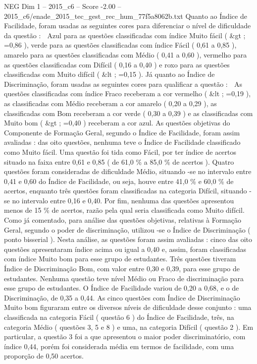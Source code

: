 \begin{textsample}{NEG Dim 1 – 2015\_c6 – Score -2.00 – 2015\_c6/enade\_2015\_tec\_gest\_rec\_hum\_77f5a8062b.txt}
Quanto ao Índice de Facilidade, foram usadas as seguintes cores para diferenciar o nível de dificuldade da questão :  Azul para as questões classificadas com índice Muito fácil ( \&gt ; =0,86 ), verde para as questões classificadas com índice Fácil ( 0,61 a 0,85 ), amarelo para as questões classificadas com Médio ( 0,41 a 0,60 ), vermelho para as questões classificadas com Difícil ( 0,16 a 0,40 ) e roxo para as questões classificadas com Muito difícil ( \&lt ; =0,15 ).
Já quanto ao Índice de Discriminação, foram usadas as seguintes cores para qualificar a questão :  As questões classificadas com índice Fraco receberam a cor vermelho ( \&lt ; =0,19 ), as classificadas com Médio receberam a cor amarelo ( 0,20 a 0,29 ), as classificadas com Bom receberam a cor verde ( 0,30 a 0,39 ) e as classificadas com Muito bom ( \&gt ; =0,40 ) receberam a cor azul.
As questões objetivas do Componente de Formação Geral, segundo o Índice de Facilidade, foram assim avaliadas : das oito questões, nenhuma teve o Índice de Facilidade classificado como Muito fácil.
Uma questão foi tida como Fácil, por ter índice de acertos situado na faixa entre 0,61 e 0,85 ( de 61,0 \% a 85,0 \% de acertos ).
Quatro questões foram consideradas de dificuldade Médio, situando -se no intervalo entre 0,41 e 0,60 do Índice de Facilidade, ou seja, houve entre 41,0 \% e 60,0 \% de acertos, enquanto três questões foram classificadas na categoria Difícil, situando -se no intervalo entre 0,16 e 0,40.
Por fim, nenhuma das questões apresentou menos de 15 \% de acertos, razão pela qual seria classificada como Muito difícil.
Como já comentado, para análise das questões objetivas, relativas à Formação Geral, segundo o poder de discriminação, utilizou -se o Índice de Discriminação ( ponto bisserial ).
Nesta análise, as questões foram assim avaliadas : cinco das oito questões apresentaram índice acima ou igual a 0,40 e, assim, foram classificadas com índice Muito bom para esse grupo de estudantes.
Três questões tiveram Índice de Discriminação Bom, com valor entre 0,30 e 0,39, para esse grupo de estudantes.
Nenhuma questão teve nível Médio ou Fraco de discriminação para esse grupo de estudantes.
O Índice de Facilidade variou de 0,20 a 0,68, e o de Discriminação, de 0,35 a 0,44.
As cinco questões com Índice de Discriminação Muito bom figuraram entre os diversos níveis de dificuldade desse conjunto : uma classificada na categoria Fácil ( questão 6 ) do Índice de Facilidade, três, na categoria Médio ( questões 3, 5 e 8 ) e uma, na categoria Difícil ( questão 2 ).
Em particular, a questão 3 foi a que apresentou o maior poder discriminatório, com índice 0,44, porém foi considerada média em termos de facilidade, com uma proporção de 0,50 acertos.

\end{textsample}

